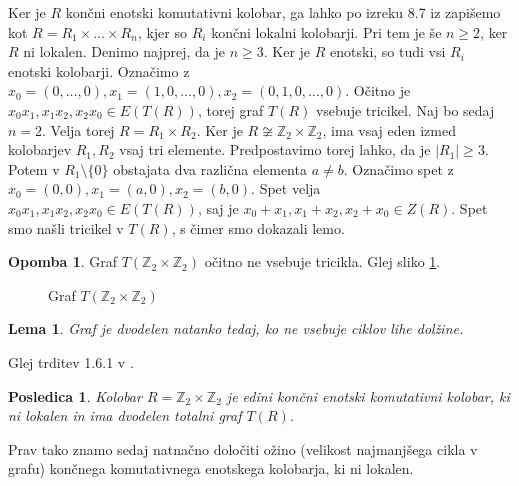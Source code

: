 \documentclass[a4paper, 12pt]{amsart}
\theoremstyle{definition} %
\newtheorem{opomba}[definicija]{Opomba}
\theoremstyle{plain} %
\newtheorem{lema}[definicija]{Lema}
\newtheorem{posledica}[definicija]{Posledica}
\newcommand{\Z}{\mathbb Z}
\begin{document}
\proof 
Ker je $R$ končni enotski komutativni kolobar, ga lahko po izreku 8.7 iz \cite{Atiyah} zapišemo kot $R=R_1 \times \dots\times R_n$, kjer so $R_i$ končni lokalni kolobarji. Pri tem je še $n\ge 2$, ker $R$ ni lokalen. Denimo najprej, da je $n\ge 3$. Ker je $R$ enotski, so tudi vsi $R_i$ enotski kolobarji. Označimo z $x_0 = (0,\dots,0), x_1 = (1,0,\dots,0), x_2 = (0,1,0,\dots,0)$. Očitno je $x_0 x_1, x_1 x_2, x_2 x_0 \in E(T(R))$, torej graf $T(R)$ vsebuje tricikel. Naj bo sedaj $n=2$. Velja torej $R= R_1 \times R_2$. Ker je $R\not \cong\Z_2 \times \Z_2$, ima vsaj eden izmed kolobarjev $R_1, R_2$ vsaj tri elemente. Predpostavimo torej lahko, da je $|R_1| \ge 3$. Potem v $R_1 \setminus\{0 \}$ obstajata dva različna elementa $a\neq b$. Označimo spet z $x_0 = (0,0), x_1 = (a,0), x_2 = (b,0)$. Spet velja $x_0 x_1, x_1 x_2, x_2 x_0 \in E(T(R))$, saj je $x_0 + x_1, x_1 + x_2, x_2 + x_0\in Z(R)$. Spet smo našli tricikel v $T(R)$, s čimer smo dokazali lemo.
\endproof

\begin{opomba}
Graf $T(\Z_2 \times \Z_2)$ očitno ne vsebuje tricikla. Glej sliko \ref{T(Z2xZ2)}.
\end{opomba}

\begin{figure}[h!]
\centering
{}
\caption{Graf $T(\Z_2 \times \Z_2)$}
\label{T(Z2xZ2)}
\end{figure}

\begin{lema}
Graf je dvodelen natanko tedaj, ko ne vsebuje ciklov lihe dolžine.
\end{lema}

\proof
Glej trditev 1.6.1 v \cite{Diestel}.
\endproof

\begin{posledica}
Kolobar $R=\Z_2 \times \Z_2$ je edini končni enotski komutativni kolobar, ki ni lokalen in ima dvodelen totalni graf $T(R)$.
\end{posledica}

Prav tako znamo sedaj natnačno določiti ožino (velikost najmanjšega cikla v grafu) končnega komutativnega enotskega kolobarja, ki ni lokalen.
\end{document}
